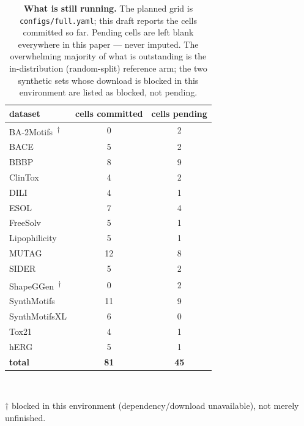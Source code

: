 \begin{table}[t]
\centering
\caption{\textbf{What is still running.} The planned grid is \texttt{configs/full.yaml}; this draft reports the cells committed so far. Pending cells are left blank everywhere in this paper --- never imputed. The overwhelming majority of what is outstanding is the in-distribution (random-split) reference arm; the two synthetic sets whose download is blocked in this environment are listed as blocked, not pending.}
\label{tab:coverage}
\footnotesize
\renewcommand{\arraystretch}{1.25}
\begin{tabular}{lcc}
\toprule
\textbf{dataset} & \textbf{cells committed} & \textbf{cells pending} \\
\midrule
BA-2Motifs~\textsuperscript{$\dagger$} & 0 & 2 \\
BACE & 5 & 2 \\
BBBP & 8 & 9 \\
ClinTox & 4 & 2 \\
DILI & 4 & 1 \\
ESOL & 7 & 4 \\
FreeSolv & 5 & 1 \\
Lipophilicity & 5 & 1 \\
MUTAG & 12 & 8 \\
SIDER & 5 & 2 \\
ShapeGGen~\textsuperscript{$\dagger$} & 0 & 2 \\
SynthMotifs & 11 & 9 \\
SynthMotifsXL & 6 & 0 \\
Tox21 & 4 & 1 \\
hERG & 5 & 1 \\
\midrule
\textbf{total} & \textbf{81} & \textbf{45} \\
\bottomrule
\end{tabular}
\\[3pt]\raggedright\footnotesize $\dagger$ blocked in this environment (dependency/download unavailable), not merely unfinished.
\end{table}
